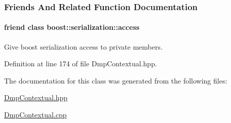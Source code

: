 \subsubsection{Friends And Related Function Documentation}
\hypertarget{classDmpBbo_1_1DmpContextual_ac98d07dd8f7b70e16ccb9a01abf56b9c}{
\paragraph[{boost\+::serialization\+::access}]{\setlength{\rightskip}{0pt plus 5cm}friend class boost\+::serialization\+::access\hspace{0.3cm}{\ttfamily [friend]}}}\label{classDmpBbo_1_1DmpContextual_ac98d07dd8f7b70e16ccb9a01abf56b9c}


Give boost serialization access to private members. 



Definition at line 174 of file Dmp\+Contextual.\+hpp.



The documentation for this class was generated from the following files\+:\begin{DoxyCompactItemize}
\item 
\hyperlink{DmpContextual_8hpp}{Dmp\+Contextual.\+hpp}\item 
\hyperlink{DmpContextual_8cpp}{Dmp\+Contextual.\+cpp}\end{DoxyCompactItemize}
